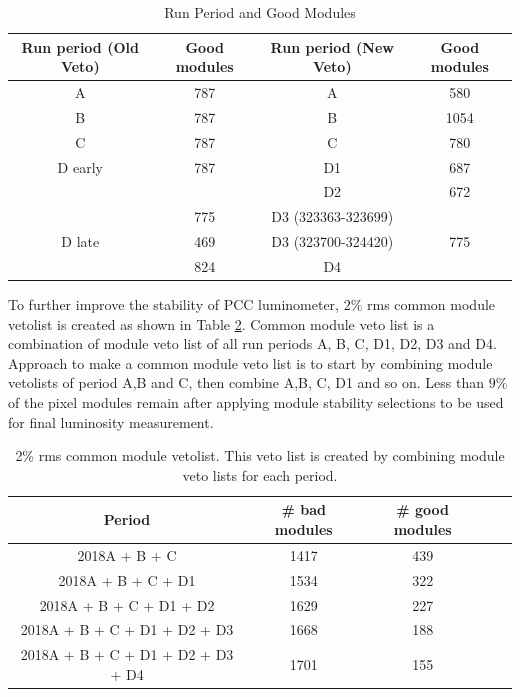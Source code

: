 

\begin{table}[htbp]
\centering
\label{tab:run-period}
\begin{tabular}{cccc}
\textbf{Run period (Old Veto)} & \textbf{Good modules} & \textbf{Run period (New Veto)} & \textbf{Good modules} \\
\hline
A & 787 & A & 580 \\
B & 787 & B & 1054 \\
C & 787 & C & 780 \\
D early & 787 & D1 & 687 \\
 & & D2 & 672 \\
 & 775 & D3 (323363-323699)  & \\
D late & 469 & D3 (323700-324420) & 775 \\
 & 824 & D4 & \\
\end{tabular}
\caption{Run Period and Good Modules}
\end{table}








To further improve the stability of PCC luminometer, $2\%$ rms common module vetolist is created as shown in Table \ref{tab:2commonveto}. Common module veto list is a combination of module veto list of all run periods A, B, C, D1, D2, D3 and D4. Approach to make a common module veto list is to start by combining module vetolists of period A,B and C, then combine A,B, C, D1 and so on. Less than $9\%$ of the pixel modules remain after applying module stability selections to be used for final luminosity measurement. 

\begin{table}
  \begin{center}
    \begin{tabular}{ccccc}  
    \textbf{Period}   & \textbf{\# bad modules} & \textbf{\# good modules} \\  \hline
     2018A + B + C      &  1417   &  439    \\  
     2018A + B + C + D1      &   1534  &   322    \\ 
     2018A + B + C + D1 + D2      &   1629 &    227   \\ 
     2018A + B + C + D1 + D2 + D3     &   1668 &   188    \\ 
     2018A + B + C + D1 + D2 + D3 + D4     &  1701 &     155  \\ 
      \end{tabular}
    \caption[Common module veto list for all periods]{2\% rms common module vetolist. This veto list is created by combining module veto lists for each period.}
    \label{tab:2commonveto}
  \end{center}
\end{table}




